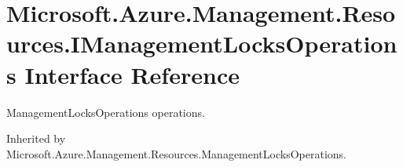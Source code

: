 \hypertarget{interface_microsoft_1_1_azure_1_1_management_1_1_resources_1_1_i_management_locks_operations}{}\section{Microsoft.\+Azure.\+Management.\+Resources.\+I\+Management\+Locks\+Operations Interface Reference}
\label{interface_microsoft_1_1_azure_1_1_management_1_1_resources_1_1_i_management_locks_operations}


Management\+Locks\+Operations operations.  




Inherited by Microsoft.\+Azure.\+Management.\+Resources.\+Management\+Locks\+Operations.

